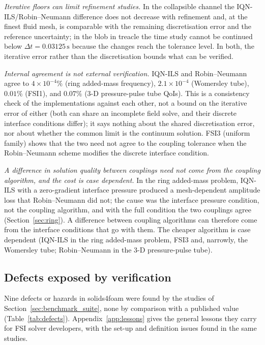 \emph{Iterative floors can limit refinement studies.}
In the collapsible channel the IQN-ILS/Robin--Neumann difference does not decrease with refinement and, at the finest fluid mesh, is comparable with the remaining discretisation error and the reference uncertainty; in the blob in treacle the time study cannot be continued below $\Delta t = 0.03125\,\mathrm{s}$ because the changes reach the tolerance level.
In both, the iterative error rather than the discretisation bounds what can be verified.

\emph{Internal agreement is not external verification.}
IQN-ILS and Robin--Neumann agree to $4\times10^{-4}\%$ (ring added-mass frequency), $2.1\times10^{-4}$ (Womersley tube), $0.01\%$ (FSI1), and $0.07\%$ (3-D pressure-pulse tube QoIs).
This is a consistency check of the implementations against each other, not a bound on the iterative error of either (both can share an incomplete field solve, and their discrete interface conditions differ); it says nothing about the shared discretisation error, nor about whether the common limit is the continuum solution.
FSI3 (uniform family) shows that the two need not agree to the coupling tolerance when the Robin--Neumann scheme modifies the discrete interface condition.

\emph{A difference in solution quality between couplings need not come from the coupling algorithm, and the cost is case dependent.}
In the ring added-mass problem, IQN-ILS with a zero-gradient interface pressure produced a mesh-dependent amplitude loss that Robin--Neumann did not; the cause was the interface pressure condition, not the coupling algorithm, and with the full condition the two couplings agree (Section~\ref{sec:ring}). A difference between coupling algorithms can therefore come from the interface conditions that go with them. The cheaper algorithm is case dependent (IQN-ILS in the ring added-mass problem, FSI3 and, narrowly, the Womersley tube; Robin--Neumann in the 3-D pressure-pulse tube).


\subsection{Defects exposed by verification}\label{sec:defects}

Nine defects or hazards in solids4foam were found by the studies of Section~\ref{sec:benchmark_suite}, none by comparison with a published value (Table~\ref{tab:defects}). Appendix~\ref{app:lessons} gives the general lessons they carry for FSI solver developers, with the set-up and definition issues found in the same studies.

